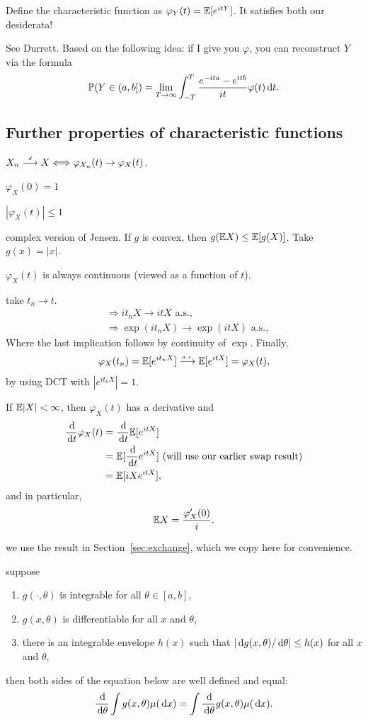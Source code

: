 \documentclass{article}
\begin{document}
 Define the characteristic function as $\varphi_Y(t) = {\mathbb E}[e^{itY}]$. It satisfies both our desiderata!

 See Durrett. Based on the following idea: if I give you $\varphi$, you can reconstruct $Y$ via the formula
\[ {\mathbb P}(Y \in (a, b]) = \lim_{T\to\infty} \int_{-T}^T \frac{e^{-ita} - e^{itb}}{it} \varphi(t) \,\mathrm{d} t. \]


\subsection{Further properties of characteristic functions}

 $X_n \stackrel{\scriptscriptstyle d}{\longrightarrow} X \Longleftrightarrow \varphi_{X_n}(t) \to \varphi_{X}(t)$.

 $\varphi_X(0) = 1$

 $|\varphi_X(t)| \le 1$

 complex version of Jensen. If $g$ is convex, then $g({\mathbb E} X) \le {\mathbb E}[g(X)]$. Take $g(x) = |x|$.

 $\varphi_X(t)$ is always continuous (viewed as a function of $t$). 

 take $t_n \to t$.
\begin{align*}
&\Longrightarrow i t_n X \to i t X \text{ a.s.}, \\
&\Longrightarrow \exp(i t_n X) \to \exp(i t X) \text{ a.s.}, 
\end{align*}
Where the last implication follows by continuity of $\exp$. Finally,
\[ \varphi_X(t_n) = {\mathbb E}[e^{it_n X}] \stackrel{\scriptscriptstyle a.s.}{\longrightarrow} {\mathbb E}[e^{itX}] = \varphi_X(t), \]
by using DCT with $|e^{it_n X}| = 1$.

 If ${\mathbb E}|X| < \infty$, then $\varphi_X(t)$ has a derivative and 
\begin{align*} 
\frac{\,\mathrm{d}}{\,\mathrm{d} t} \varphi_X(t) &= \frac{\,\mathrm{d}}{\,\mathrm{d} t} {\mathbb E}[ e^{itX} ] \\
&= {\mathbb E}[\frac{\,\mathrm{d}}{\,\mathrm{d} t} e^{itX}] \text{ (will use our earlier swap result)} \\
&= {\mathbb E}[iX e^{itX}], 
\end{align*}
and in particular,
\[ {\mathbb E} X = \frac{\varphi'_X(0)}{i}. \]

 we use the result in Section~\ref{sec:exchange}, which we copy here for convenience.

 suppose 
\begin{enumerate}
	\item $g(\cdot, \theta)$ is integrable for all $\theta \in [a, b]$, 
	\item $g(x, \theta)$ is differentiable for all $x$ and $\theta$, 
	\item there is an integrable envelope $h(x)$ such that $|\,\mathrm{d} g(x, \theta) / \,\mathrm{d} \theta| \le h(x)$ for all $x$ and $\theta$,
\end{enumerate}
then both sides of the equation below are well defined and equal:
\[ \frac{\,\mathrm{d}}{\,\mathrm{d} \theta} \int g(x, \theta) \mu(\,\mathrm{d} x) = \int \frac{\,\mathrm{d}}{\,\mathrm{d} \theta} g(x, \theta)   \mu(\,\mathrm{d} x). \]
\end{document}
